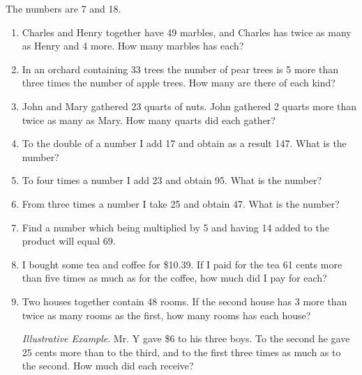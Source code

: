 \documentclass{book}
\begin{document}
The numbers are 7 and 18.

\begin{enumerate}
\item Charles and Henry together have 49 marbles, and
Charles has twice as many as Henry and 4 more. How
many marbles has each?

\item In an orchard containing 33 trees the number of
pear trees is 5 more than three times the number of apple
trees. How many are there of each kind?

\item John and Mary gathered 23 quarts of nuts. John
gathered 2 quarts more than twice as many as Mary. How
many quarts did each gather?

\item To the double of a number I add 17 and obtain as
a result 147. What is the number?

\item To four times a number I add 23 and obtain 95.
What is the number?

\item From three times a number I take 25 and obtain 47.
What is the number?


\item Find a number which being multiplied by 5 and having 14
added to the product will equal 69.

\item I bought some tea and coffee for \$10.39. If I paid for the
tea 61 cents more than five times as much as for the coffee, how
much did I pay for each?

\item Two houses together contain 48 rooms. If the second house
has 3 more than twice as many rooms as the first, how many rooms
has each house?

\textit{ Illustrative Example}. Mr. Y gave \$6 to his three boys.
To the second he gave 25 cents more than to the third, and to the
first three times as much as to the second. How much did each
receive?


\end{enumerate}
\end{document}

